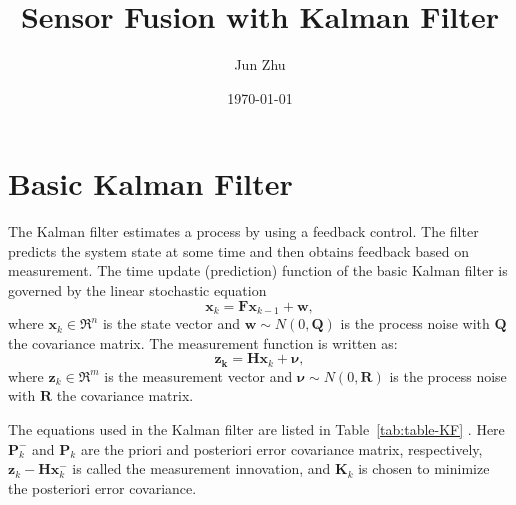 \documentclass[12pt]{article}
\title{Sensor Fusion with Kalman Filter}
\author{Jun Zhu}
\date{\today}
\begin{document}
\maketitle


\section{Basic Kalman Filter}\label{basic-kalman-filter}

The Kalman filter estimates a process by using a feedback control. The filter predicts the system state at some time and then obtains feedback based on measurement. The time update (prediction) function of the basic Kalman filter is governed by the linear stochastic equation
%
\begin{equation}
	\mathbf{x}_{k} = \mathbf{F}\mathbf{x}_{k - 1} + \mathbf{w},
\end{equation}
%
where \(\mathbf{x}_{k} \in \mathfrak{R}^{n}\) is the state vector and \(\mathbf{w}\sim N( 0,\mathbf{Q})\) is the process noise with \(\mathbf{Q}\) the covariance matrix. The measurement function is written as:
%
\begin{equation}
	\mathbf{z}_{\mathbf{k}} = \mathbf{H}\mathbf{x}_{k} + \boldsymbol{\nu},
\end{equation}
%
where \(\mathbf{z}_{k} \in \mathfrak{R}^{m}\) is the measurement vector and \(\boldsymbol{\nu}\sim N( 0,\mathbf{R})\) is the process noise with \(\mathbf{R}\) the covariance matrix.

The equations used in the Kalman filter are listed in Table~\ref{tab:table-KF} \cite{Welch}. Here \(\mathbf{P}_{k}^{-}\) and \(\mathbf{P}_{k}\) are the priori and posteriori error covariance matrix, respectively, \(\mathbf{z}_{k} - \mathbf{H}\mathbf{x}_{k}^{-}\) is called the measurement innovation, and \(\mathbf{K}_{k}\) is chosen to minimize the posteriori error covariance.
\end{document}
